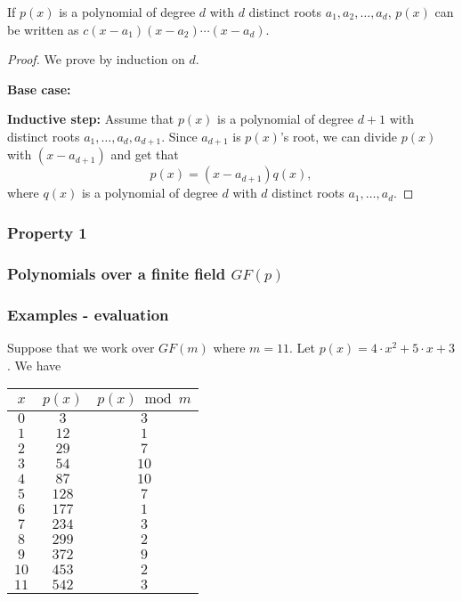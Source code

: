 \begin{frame}
  \begin{lemma}
    If $p(x)$ is a polynomial of degree $d$ with $d$ distinct roots
    $a_1,a_2,\ldots,a_d$, $p(x)$ can be written as
    $c(x-a_1)(x-a_2)\cdots(x-a_d)$.
  \end{lemma}
  \begin{proof}
    {\small
      \pause
      We prove by induction on $d$. \pause
      
      {\bf Base case:}
      \pause

      {\bf Inductive step:} \pause Assume that $p(x)$ is a polynomial
      of degree $d+1$ with distinct roots $a_1,\ldots,a_d,a_{d+1}$.
      \pause Since $a_{d+1}$ is $p(x)$'s root, we can divide $p(x)$
      with $(x-a_{d+1})$ and get that
      \[
      p(x) = (x-a_{d+1})q(x),
      \]
      where \pause $q(x)$ is a polynomial of degree $d$ with $d$
      distinct roots $a_1,\ldots,a_d$. 
      \vspace{0.5in}
    }
  \end{proof}
\end{frame}

\begin{frame}
  \frametitle{Property 1}
\end{frame}

\begin{frame}
  \frametitle{Polynomials over a finite field $GF(p)$}
\end{frame}

\begin{frame}
  \frametitle{Examples - evaluation}

  Suppose that we work over $GF(m)$ where $m=11$.  Let $p(x) = 4\cdot
  x^2 + 5\cdot x + 3$.  We have

  {\small
  \begin{tabular}{c|c|c}
    $x$ & $p(x)$ & $p(x)\bmod m$ \\
    \hline
    $0$ & $3$ & $3$ \\
    $1$ & $12$ & $1$ \\
    $2$ & $29$ & $7$ \\
    $3$ & $54$ & $10$ \\
    $4$ & $87$ & $10$ \\
    $5$ & $128$ & $7$ \\
    $6$ & $177$ & $1$ \\
    $7$ & $234$ & $3$ \\
    $8$ & $299$ & $2$ \\
    $9$ & $372$ & $9$ \\
    $10$ & $453$ & $2$ \\
    $11$ & $542$ & $3$ \\
  \end{tabular}
  }
\end{frame}

